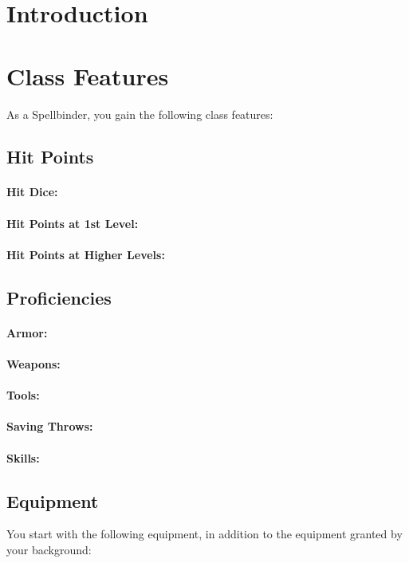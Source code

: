 \section{Introduction}

\section{Class Features}

As a Spellbinder, you gain the following class features:

\subsection{Hit Points}
\paragraph{Hit Dice:}
\paragraph{Hit Points at 1st Level:}
\paragraph{Hit Points at Higher Levels:}

\subsection{Proficiencies}
\paragraph{Armor:}
\paragraph{Weapons:}
\paragraph{Tools:}
\paragraph{Saving Throws:}
\paragraph{Skills:}

\subsection{Equipment}
You start with the following equipment, in addition to the equipment granted by your background:

